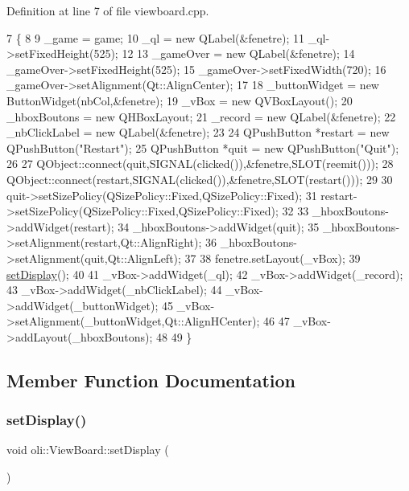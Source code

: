 Definition at line 7 of file viewboard.\+cpp.


\begin{DoxyCode}
7                                                                 \{
8 
9     \_game = game;
10     \_ql = \textcolor{keyword}{new} QLabel(&fenetre);
11     \_ql->setFixedHeight(525);
12 
13     \_gameOver = \textcolor{keyword}{new} QLabel(&fenetre);
14     \_gameOver->setFixedHeight(525);
15     \_gameOver->setFixedWidth(720);
16     \_gameOver->setAlignment(Qt::AlignCenter);
17 
18     \_buttonWidget = \textcolor{keyword}{new} ButtonWidget(nbCol,&fenetre);
19     \_vBox = \textcolor{keyword}{new} QVBoxLayout();
20     \_hboxBoutons = \textcolor{keyword}{new} QHBoxLayout;
21     \_record = \textcolor{keyword}{new} QLabel(&fenetre);
22     \_nbClickLabel = \textcolor{keyword}{new} QLabel(&fenetre);
23 
24     QPushButton *restart = \textcolor{keyword}{new} QPushButton(\textcolor{stringliteral}{"Restart"});
25     QPushButton *quit = \textcolor{keyword}{new} QPushButton(\textcolor{stringliteral}{"Quit"});
26 
27     QObject::connect(quit,SIGNAL(clicked()),&fenetre,SLOT(reemit()));
28     QObject::connect(restart,SIGNAL(clicked()),&fenetre,SLOT(restart()));
29 
30     quit->setSizePolicy(QSizePolicy::Fixed,QSizePolicy::Fixed);
31     restart->setSizePolicy(QSizePolicy::Fixed,QSizePolicy::Fixed);
32 
33     \_hboxBoutons->addWidget(restart);
34     \_hboxBoutons->addWidget(quit);
35     \_hboxBoutons->setAlignment(restart,Qt::AlignRight);
36     \_hboxBoutons->setAlignment(quit,Qt::AlignLeft);
37 
38     fenetre.setLayout(\_vBox);
39     \hyperlink{classoli_1_1_view_board_a0f9e3b18dfb6f2224bef1b73ce8b3929}{setDisplay}();
40 
41     \_vBox->addWidget(\_ql);
42     \_vBox->addWidget(\_record);
43     \_vBox->addWidget(\_nbClickLabel);
44     \_vBox->addWidget(\_buttonWidget);
45     \_vBox->setAlignment(\_buttonWidget,Qt::AlignHCenter);
46 
47     \_vBox->addLayout(\_hboxBoutons);
48 
49 \}
\end{DoxyCode}


\subsection{Member Function Documentation}
\hypertarget{classoli_1_1_view_board_a0f9e3b18dfb6f2224bef1b73ce8b3929}{}\label{classoli_1_1_view_board_a0f9e3b18dfb6f2224bef1b73ce8b3929} 
\subsubsection{\texorpdfstring{set\+Display()}{setDisplay()}}
{\footnotesize\ttfamily void oli\+::\+View\+Board\+::set\+Display (\begin{DoxyParamCaption}{ }\end{DoxyParamCaption})}



